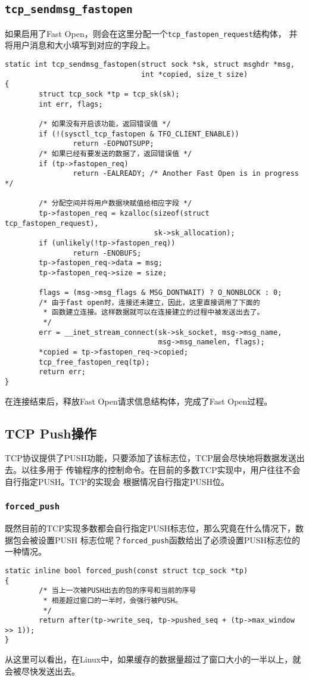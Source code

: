 \subsection{\texttt{tcp_sendmsg_fastopen}}
如果启用了Fast Open，则会在这里分配一个\texttt{tcp_fastopen_request}结构体，
并将用户消息和大小填写到对应的字段上。
\begin{verbatim}
static int tcp_sendmsg_fastopen(struct sock *sk, struct msghdr *msg,
                                int *copied, size_t size)
{
        struct tcp_sock *tp = tcp_sk(sk);
        int err, flags;

        /* 如果没有开启该功能，返回错误值 */
        if (!(sysctl_tcp_fastopen & TFO_CLIENT_ENABLE))
                return -EOPNOTSUPP;
        /* 如果已经有要发送的数据了，返回错误值 */
        if (tp->fastopen_req)
                return -EALREADY; /* Another Fast Open is in progress */

        /* 分配空间并将用户数据块赋值给相应字段 */
        tp->fastopen_req = kzalloc(sizeof(struct tcp_fastopen_request),
                                   sk->sk_allocation);
        if (unlikely(!tp->fastopen_req))
                return -ENOBUFS;
        tp->fastopen_req->data = msg;
        tp->fastopen_req->size = size;

        flags = (msg->msg_flags & MSG_DONTWAIT) ? O_NONBLOCK : 0;
        /* 由于fast open时，连接还未建立，因此，这里直接调用了下面的
         * 函数建立连接。这样数据就可以在连接建立的过程中被发送出去了。
         */
        err = __inet_stream_connect(sk->sk_socket, msg->msg_name,
                                    msg->msg_namelen, flags);
        *copied = tp->fastopen_req->copied;
        tcp_free_fastopen_req(tp);
        return err;
}
\end{verbatim}
在连接结束后，释放Fast Open请求信息结构体，完成了Fast Open过程。

\subsection{TCP Push操作}
TCP协议提供了PUSH功能，只要添加了该标志位，TCP层会尽快地将数据发送出去。以往多用于
传输程序的控制命令。在目前的多数TCP实现中，用户往往不会自行指定PUSH。TCP的实现会
根据情况自行指定PUSH位。
\subsubsection{\texttt{forced_push}}
既然目前的TCP实现多数都会自行指定PUSH标志位，那么究竟在什么情况下，数据包会被设置PUSH
标志位呢？\texttt{forced_push}函数给出了必须设置PUSH标志位的一种情况。
\begin{verbatim}
static inline bool forced_push(const struct tcp_sock *tp)
{
        /* 当上一次被PUSH出去的包的序号和当前的序号
         * 相差超过窗口的一半时，会强行被PUSH。
         */
        return after(tp->write_seq, tp->pushed_seq + (tp->max_window >> 1));
}
\end{verbatim}
从这里可以看出，在Linux中，如果缓存的数据量超过了窗口大小的一半以上，就会被尽快发送出去。

